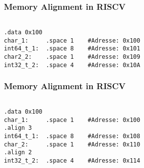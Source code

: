 \documentclass[xcolor=pdftex,dvipsnames,table]{beamer}
\begin{document}
\begin{frame}[fragile]
	\frametitle{Memory Alignment in RISCV}
	\begin{lstlisting}
	
.data 0x100
char_1:		.space 1	#Adresse: 0x100
int64_t_1:	.space 8	#Adresse: 0x101
char2_2:	.space 1	#Adresse: 0x109
int32_t_2:	.space 4	#Adresse: 0x10A

	\end{lstlisting}
\end{frame}

\begin{frame}[fragile]
	\frametitle{Memory Alignment in RISCV}
	\begin{lstlisting}
	
.data 0x100
char_1:		.space 1	#Adresse: 0x100
.align 3				
int64_t_1:	.space 8	#Adresse: 0x108
char_2:		.space 1	#Adresse: 0x110
.align 2
int32_t_2:	.space 4	#Adresse: 0x114
	
	\end{lstlisting}
\end{frame}
\end{document}
